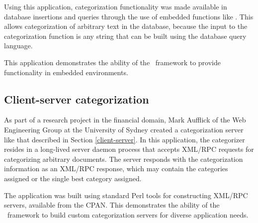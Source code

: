Using this application, categorization functionality was made
available in database insertions and queries through the use of
embedded functions like .  This allows
categorization of arbitrary text in the database, because the input to
the categorization function is any string that can be built using the
database query language.

This application demonstrates the ability of the \aicat\ framework to
provide functionality in embedded environments.

\subsection{Client-server categorization}

As part of a research project in the financial domain, Mark Aufflick
of the Web Engineering Group at the University of Sydney created a
categorization server like that described in Section
\ref{client-server}.  In this application, the categorizer resides in
a long-lived server daemon process that accepts XML/RPC requests for
categorizing arbitrary documents.  The server responds with the
categorization information as an XML/RPC response, which may contain
the categories assigned or the single best category assigned.

The application was built using standard Perl tools for constructing
XML/RPC servers, available from the CPAN.  This demonstrates the
ability of the \aicat\ framework to build custom categorization
servers for diverse application needs.
